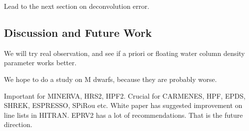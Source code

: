 Lead to the next section on deconvolution error.


\subsection{Discussion and Future Work}\label{keck:telluric:future}

We will try real observation, and see if a priori or floating water
column density parameter works better.

We hope to do a study on M dwarfs, because they are probably worse.

Important for MINERVA, HRS2, HPF2. Crucial for CARMENES, HPF, EPDS, SHREK,
ESPRESSO, SPiRou etc. White paper has suggested improvement on line
lists in HITRAN. EPRV2 has a lot of recommendations. That is the
future direction.
